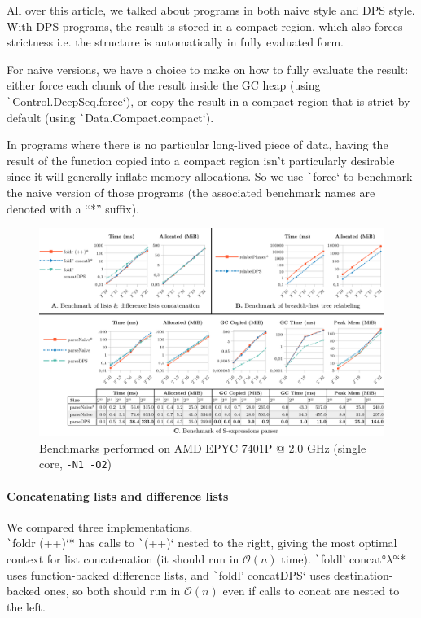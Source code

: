 \documentclass[english]{jflart}
\begin{document}
All over this article, we talked about programs in both naive style and DPS style. With DPS programs, the result is stored in a compact region, which also forces strictness i.e. the structure is automatically in fully evaluated form.

For naive versions, we have a choice to make on how to fully evaluate the result: either force each chunk of the result inside the GC heap (using \texttt`Control.DeepSeq.force`), or copy the result in a compact region that is strict by default (using \texttt`Data.Compact.compact`).

In programs where there is no particular long-lived piece of data, having the result of the function copied into a compact region isn't particularly desirable since it will generally inflate memory allocations. So we use \texttt`force` to benchmark the naive version of those programs (the associated benchmark names are denoted with a ``*'' suffix).

\begin{figure}[t]\centering
  \hspace*{-1.5cm}\includegraphics[width=16.8cm]{bench-charts.pdf}
  \caption{Benchmarks performed on AMD EPYC 7401P @ 2.0 GHz (single core, \texttt{-N1 -O2})}
  \label{fig:bench-charts}
\end{figure}

\paragraph{Concatenating lists and difference lists}

We compared three implementations. \\\texttt`foldr (++)`* has calls to \texttt`(++)` nested to the right, giving the most optimal context for list concatenation (it should run in $\mathcal{O}(n)$ time). \texttt`foldl' concat°$\lambda$°`* uses function-backed difference lists, and \texttt`foldl' concatDPS` uses destin\-ation-backed ones, so both should run in $\mathcal{O}(n)$ even if calls to concat are nested to the left.
\end{document}

